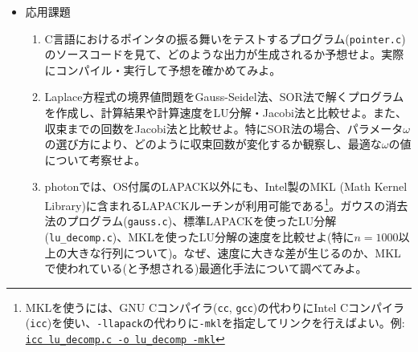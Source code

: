 \documentclass[11pt]{jarticle}
\begin{document}
\begin{itemize}
\item 応用課題
  \begin{enumerate}
  \item C言語におけるポインタの振る舞いをテストするプログラム({\tt pointer.c})のソースコードを見て、どのような出力が生成されるか予想せよ。実際にコンパイル・実行して予想を確かめてみよ。
  \item Laplace方程式の境界値問題をGauss-Seidel法、SOR法で解くプログラムを作成し、計算結果や計算速度をLU分解・Jacobi法と比較せよ。また、収束までの回数をJacobi法と比較せよ。特にSOR法の場合、パラメータ$\omega$の選び方により、どのように収束回数が変化するか観察し、最適な$\omega$の値について考察せよ。
  \item photonでは、OS付属のLAPACK以外にも、Intel製のMKL (Math Kernel Library)に含まれるLAPACKルーチンが利用可能である\footnote{MKLを使うには、GNU Cコンパイラ({\tt cc}, {\tt gcc})の代わりにIntel Cコンパイラ({\tt icc})を使い、{\tt -llapack}の代わりに{\tt -mkl}を指定してリンクを行えばよい。例: \underline{\tt icc lu\_decomp.c -o lu\_decomp -mkl}}。ガウスの消去法のプログラム({\tt gauss.c})、標準LAPACKを使ったLU分解({\tt lu\_decomp.c})、MKLを使ったLU分解の速度を比較せよ(特に$n=1000$以上の大きな行列について)。なぜ、速度に大きな差が生じるのか、MKLで使われている(と予想される)最適化手法について調べてみよ。
  \end{enumerate}  
\end{itemize}
\end{document}
